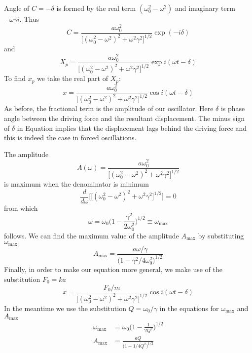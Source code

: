 \documentclass[../main.tex]{subfiles}
\begin{document}
Angle of $C=-\delta$ is formed by the real term $(\omega_0^2-\omega^2)$ and imaginary term $-\omega\gamma i$. Thus
\begin{equation*}
    C=\frac{a\omega_0^2 }{\big[(\omega_0^2- \omega^2)^2 +\omega^2\gamma^2\big]^{1/2} }\exp (-i\delta )
\end{equation*}
and 
\begin{equation*}
    X_p=\frac{a\omega_0^2 }{\big[(\omega_0^2- \omega^2)^2 +\omega^2\gamma^2\big]^{1/2} }\exp i(\omega t-\delta )
\end{equation*}
To find $x_p$ we take the real part of $X_p$:
\begin{equation*}
    x=\frac{a\omega_0^2 }{\big[(\omega_0^2- \omega^2)^2 +\omega^2\gamma^2\big]^{1/2} }\cos i(\omega t-\delta )
\end{equation*}
As before, the fractional term is the amplitude of our oscillator. Here $\delta $ is phase angle between the driving force and the resultant displacement. The minus sign of $\delta $ in Equation implies that the displacement lags behind the driving force and this is indeed the case in forced oscillations. 

The amplitude
\begin{equation*}
    A(\omega)=\frac{a\omega_0^2 }{\big[(\omega_0^2- \omega^2)^2 +\omega^2\gamma^2\big]^{1/2} }
\end{equation*}
is maximum when the denominator is minimum
\begin{equation*}
    \frac{d}{d\omega}\biggl[\big[(\omega_0^2- \omega^2)^2 +\omega^2\gamma^2\big]^{1/2} \biggr]= 0
\end{equation*}
from which 
\begin{equation*}
    \omega=\omega_0\bigg(1-\frac{\gamma^2}{2\omega_0^2}\bigg)^{1/2}\equiv\omega_{\text{max}}
\end{equation*}
follows. We can find the maximum value of the amplitude $A_{\text{max}}$ by substituting $\omega_{\text{max}}$
\begin{equation*}
    A_{\text{max}}=\frac{a\omega/\gamma}{\big(1-\gamma^2/4\omega_0^2 \big)^{1/2}}
\end{equation*}
Finally, in order to make our equation more general, we make use of the substitution $F_0 = ka$
\begin{equation*}
    x=\frac{F_0/m }{\big[(\omega_0^2- \omega^2)^2 +\omega^2\gamma^2\big]^{1/2} }\cos i(\omega t-\delta )
\end{equation*}
In the meantime we use the substitution $Q = \omega_0/\gamma$ in the equations for $\omega_{\text{max}}$ and $A_{\text{max}}$
\begin{align*}
    \omega_{\text{max}}&=\omega_0\bigg(1-\frac{1}{2Q^2}\bigg)^{1/2}\\
    A_{\text{max}}&=\frac{aQ}{\big(1-1/4Q^2 \big)^{1/2}}
\end{align*}
\end{document}
